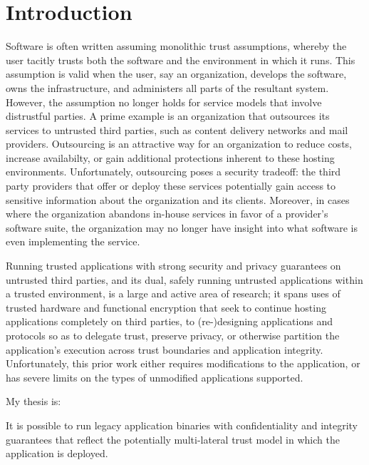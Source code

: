 \section{Introduction}
\label{sec:intro}

Software is often written assuming monolithic trust assumptions, whereby
the user tacitly trusts both the software and the environment in which it runs.
%
This assumption is valid when the user, say an organization, develops the
software, owns the infrastructure, and administers all parts of the resultant
system.
%
However, the assumption no longer holds for service models that involve
distrustful parties.
%
A prime example is an organization that outsources its services to untrusted
third parties, such as content delivery networks and mail providers.
%
Outsourcing is an attractive way for an organization to reduce costs,
increase availabilty, or gain additional protections inherent to these hosting
environments.
%
Unfortunately, outsourcing poses a security tradeoff: the third party
providers that offer or deploy these services potentially gain access to
sensitive information about the organization and its clients.   
%
Moreover, in cases where the organization abandons in-house services in favor
of a provider's software suite, the organization may no longer have insight
into what software is even implementing the service.


%
Running trusted applications with strong security and privacy guarantees on
untrusted third parties, and its dual, safely running untrusted applications
within a trusted environment, is a large and active area of research; it spans
uses of trusted hardware and functional encryption that seek to continue
hosting applications completely on third parties, to (re-)designing
applications and protocols so as to delegate trust, preserve privacy, or
otherwise partition the application's execution across trust boundaries and 
application integrity.
%
Unfortunately, this prior work either requires modifications to the
application, or has severe limits on the types of unmodified applications
supported.


My thesis is:
\begin{displayquote}
    It is possible to run legacy application binaries with confidentiality and
    integrity guarantees that reflect the potentially multi-lateral trust model
    in which the application is deployed.
\end{displayquote}


